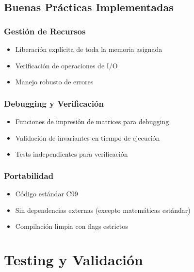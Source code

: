 \documentclass[
]{article}
\providecommand{\tightlist}{%
  \setlength{\itemsep}{0pt}\setlength{\parskip}{0pt}}
\begin{document}
\subsection{Buenas Prácticas
Implementadas}\label{buenas-pruxe1cticas-implementadas}

\subsubsection{Gestión de Recursos}\label{gestiuxf3n-de-recursos}

\begin{itemize}
\tightlist
\item
  Liberación explícita de toda la memoria asignada
\item
  Verificación de operaciones de I/O
\item
  Manejo robusto de errores
\end{itemize}

\subsubsection{Debugging y
Verificación}\label{debugging-y-verificaciuxf3n}

\begin{itemize}
\tightlist
\item
  Funciones de impresión de matrices para debugging
\item
  Validación de invariantes en tiempo de ejecución
\item
  Tests independientes para verificación
\end{itemize}

\subsubsection{Portabilidad}\label{portabilidad}

\begin{itemize}
\tightlist
\item
  Código estándar C99
\item
  Sin dependencias externas (excepto matemáticas estándar)
\item
  Compilación limpia con flags estrictos
\end{itemize}

\section{Testing y Validación}\label{testing-y-validaciuxf3n}
\end{document}

